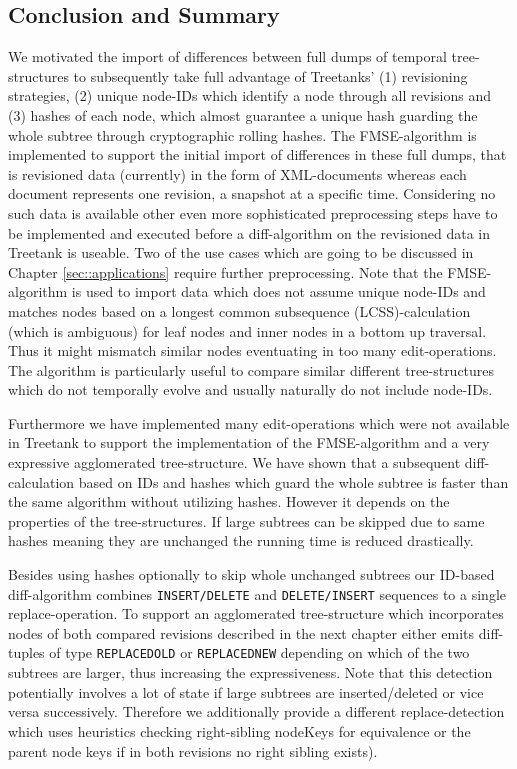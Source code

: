 \subsection{Conclusion and Summary}
We motivated the import of differences between full dumps of temporal tree-structures to subsequently take full advantage of Treetanks' (1) revisioning strategies, (2) unique node-IDs which identify a node through all revisions and (3) hashes of each node, which almost guarantee a unique hash guarding the whole subtree through cryptographic rolling hashes. The FMSE-algorithm is implemented to support the initial import of differences in these full dumps, that is revisioned data (currently) in the form of XML-documents whereas each document represents one revision, a snapshot at a specific time. Considering no such data is available other even more sophisticated preprocessing steps have to be implemented and executed before a diff-algorithm on the revisioned data in Treetank is useable. Two of the use cases which are going to be discussed in Chapter \ref{sec::applications} require further preprocessing. Note that the FMSE-algorithm is used to import data which does not assume unique node-IDs and matches nodes based on a longest common subsequence (LCSS)-calculation (which is ambiguous) for leaf nodes and inner nodes in a bottom up traversal. Thus it might mismatch similar nodes eventuating in too many edit-operations. The algorithm is particularly useful to compare similar different tree-structures which do not temporally evolve and usually naturally do not include node-IDs.

Furthermore we have implemented many edit-operations which were not available in Treetank to support the implementation of the FMSE-algorithm and a very expressive agglomerated tree-structure. We have shown that a subsequent diff-calculation based on IDs and hashes which guard the whole subtree is faster than the same algorithm without utilizing hashes. However it depends on the properties of the tree-structures. If large subtrees can be skipped due to same hashes meaning they are unchanged the running time is reduced drastically.

Besides using hashes optionally to skip whole unchanged subtrees our ID-based diff-algorithm combines \texttt{INSERT/DELETE} and \texttt{DELETE/INSERT} sequences to a single replace-operation. To support an agglomerated tree-structure which incorporates nodes of both compared revisions described in the next chapter either emits diff-tuples of type \texttt{REPLACEDOLD} or \texttt{REPLACEDNEW} depending on which of the two subtrees are larger, thus increasing the expressiveness. Note that this detection potentially involves a lot of state if large subtrees are inserted/deleted or vice versa successively. Therefore we additionally provide a different replace-detection which uses heuristics checking right-sibling nodeKeys for equivalence or the parent node keys if in both revisions no right sibling exists).

